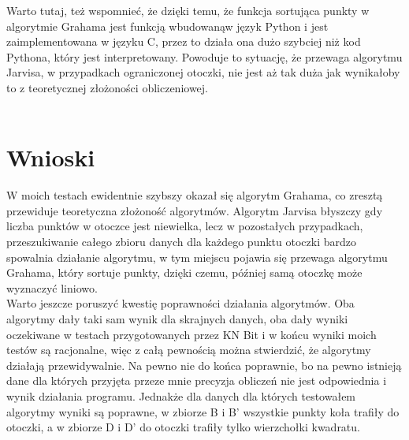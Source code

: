 \documentclass[a4paper]{article}
\begin{document}
Warto tutaj, też wspomnieć, że dzięki temu, że funkcja sortująca punkty w algorytmie Grahama jest funkcją wbudowanąw język Python i jest zaimplementowana w języku C, przez
to działa ona dużo szybciej niż kod Pythona, który jest interpretowany. Powoduje to sytuację, że przewaga algorytmu Jarvisa, w przypadkach ograniczonej otoczki, nie jest aż tak duża jak wynikałoby to z teoretycznej złożoności obliczeniowej.\\\\
\pagebreak

\section{Wnioski}
W moich testach ewidentnie szybszy okazał się algorytm Grahama, co zresztą przewiduje teoretyczna złożoność algorytmów.
Algorytm Jarvisa błyszczy gdy liczba punktów w otoczce jest niewielka, lecz w pozostałych przypadkach, przeszukiwanie całego
zbioru danych dla każdego punktu otoczki bardzo spowalnia działanie algorytmu, w tym miejscu pojawia się przewaga algorytmu 
Grahama, który sortuje punkty, dzięki czemu, później samą otoczkę może wyznaczyć liniowo.\\

\noindent Warto jeszcze poruszyć kwestię poprawności działania algorytmów. Oba algorytmy dały taki sam wynik dla skrajnych danych,
oba dały wyniki oczekiwane w testach przygotowanych przez KN Bit i w końcu wyniki moich testów są racjonalne, więc z całą
pewnością można stwierdzić, że algorytmy działają przewidywalnie. Na pewno nie do końca poprawnie, bo na pewno istnieją dane 
dla których przyjęta przeze mnie precyzja obliczeń nie jest odpowiednia i wynik działania programu. Jednakże dla danych dla których
testowałem algorytmy wyniki są poprawne, w zbiorze B i B' wszystkie punkty koła trafiły do otoczki, a w zbiorze D i D' do otoczki
trafiły tylko wierzchołki kwadratu. 
\end{document}
